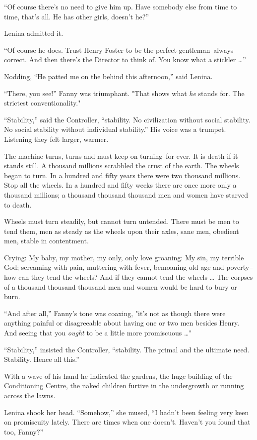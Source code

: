 \documentclass[12pt]{report}
\begin{document}
``Of course there's no need to give him up. Have somebody else from time
to time, that's all. He has other girls, doesn't he?''

Lenina admitted it.

``Of course he does. Trust Henry Foster to be the perfect
gentleman--always correct. And then there's the Director to think of.
You know what a stickler \ldots{}''

Nodding, ``He patted me on the behind this afternoon,'' said Lenina.

``There, you see!'' Fanny was triumphant. "That shows what \emph{he}
stands for. The strictest conventionality."

``Stability,'' said the Controller, ``stability. No civilization without
social stability. No social stability without individual stability.''
His voice was a trumpet. Listening they felt larger, warmer.

The machine turns, turns and must keep on turning--for ever. It is death
if it stands still. A thousand millions scrabbled the crust of the
earth. The wheels began to turn. In a hundred and fifty years there were
two thousand millions. Stop all the wheels. In a hundred and fifty weeks
there are once more only a thousand millions; a thousand thousand
thousand men and women have starved to death.

Wheels must turn steadily, but cannot turn untended. There must be men
to tend them, men as steady as the wheels upon their axles, sane men,
obedient men, stable in contentment.

Crying: My baby, my mother, my only, only love groaning: My sin, my
terrible God; screaming with pain, muttering with fever, bemoaning old
age and poverty--how can they tend the wheels? And if they cannot tend
the wheels \ldots{} The corpses of a thousand thousand thousand men and
women would be hard to bury or burn.

``And after all,'' Fanny's tone was coaxing, "it's not as though there
were anything painful or disagreeable about having one or two men
besides Henry. And seeing that you \emph{ought} to be a little more
promiscuous \ldots{}"

``Stability,'' insisted the Controller, ``stability. The primal and the
ultimate need. Stability. Hence all this.''

With a wave of his hand he indicated the gardens, the huge building of
the Conditioning Centre, the naked children furtive in the undergrowth
or running across the lawns.

Lenina shook her head. ``Somehow,'' she mused, ``I hadn't been feeling
very keen on promiscuity lately. There are times when one doesn't.
Haven't you found that too, Fanny?''
\end{document}
